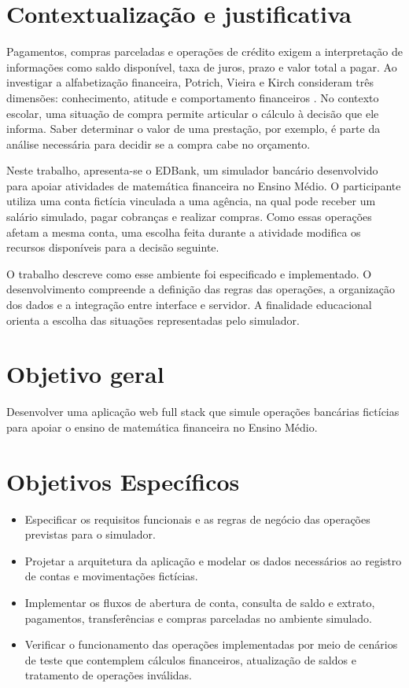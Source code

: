 \section{Contextualização e justificativa}
\label{sec-introducao-contextualizacao}

Pagamentos, compras parceladas e operações de crédito exigem a
interpretação de informações como saldo disponível, taxa de juros,
prazo e valor total a pagar. Ao investigar a alfabetização
financeira, Potrich, Vieira e Kirch consideram três dimensões:
conhecimento, atitude e comportamento financeiros
\cite{potrich2015}. No contexto escolar, uma situação de compra
permite articular o cálculo à decisão que ele informa. Saber
determinar o valor de uma prestação, por exemplo, é parte da
análise necessária para decidir se a compra cabe no orçamento.

Neste trabalho, apresenta-se o EDBank, um simulador bancário
desenvolvido para apoiar atividades de matemática financeira no
Ensino Médio. O participante utiliza uma conta fictícia vinculada
a uma agência, na qual pode receber um salário simulado, pagar
cobranças e realizar compras. Como essas operações afetam a mesma
conta, uma escolha feita durante a atividade modifica os recursos
disponíveis para a decisão seguinte.

O trabalho descreve como esse ambiente foi especificado e
implementado. O desenvolvimento compreende a definição das regras
das operações, a organização dos dados e a integração entre
interface e servidor. A finalidade educacional orienta a escolha
das situações representadas pelo simulador.

\section{Objetivo geral}
\label{sec-introducao-objetivo-geral}

Desenvolver uma aplicação web full stack que simule operações bancárias fictícias para apoiar o ensino de matemática financeira no Ensino Médio.


\section{Objetivos Específicos}
\label{sec-introducao-objetivo-especifico}

\begin{itemize}
    \item Especificar os requisitos funcionais e as regras de negócio das operações previstas para o simulador.

    \item Projetar a arquitetura da aplicação e modelar os dados necessários ao registro de contas e movimentações fictícias.

    \item Implementar os fluxos de abertura de conta, consulta de saldo e extrato, pagamentos, transferências e compras parceladas no ambiente simulado.

    \item Verificar o funcionamento das operações implementadas por meio de cenários de teste que contemplem cálculos financeiros, atualização de saldos e tratamento de operações inválidas.
\end{itemize}